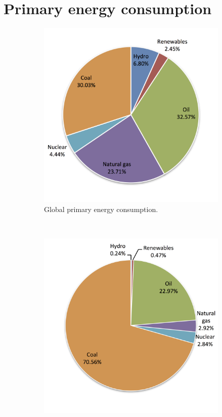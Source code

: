 \section{Primary energy consumption}
\begin{figure}[!b]
        \centering                
        \begin{subfigure}[b]{0.45\textwidth}
                \centering
                \includegraphics[width=1\textwidth]{FIG/PrimWorld}
                \caption{Global primary energy consumption.}\label{PrimWorld}
        \end{subfigure}
        ~
        \begin{subfigure}[b]{0.45\textwidth}
                \centering
                \includegraphics[width=1\textwidth]{FIG/PrimSA}

\end{subfigure}
\end{figure}
